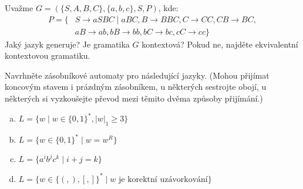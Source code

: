 \documentclass[a4paper,12pt]{amsart}
\begin{document}
\medskip\begin{problem}
    
    Uvažme $G=(\{S,A,B,C\},\{a,b,c\},S,P)$, kde:
    \begin{align*}
        P=\{&S\rightarrow aSBC\mid aBC, B\rightarrow BBC,  C\rightarrow CC, CB\rightarrow BC,\\ 
        &aB\rightarrow ab, bB\rightarrow bb, bC\rightarrow bc, cC\rightarrow cc\}
    \end{align*}
    Jaký jazyk generuje? Je gramatika $G$ kontextová? Pokud ne, najděte ekvivalentní kontextovou gramatiku.
    
\end{problem}


\medskip\begin{problem}

    Navrhněte zásobníkové automaty pro následující jazyky. (Mohou přijímat koncovým stavem i prázdným zásobníkem, u některých sestrojte obojí, u některých si vyzkoušejte převod mezi těmito dvěma způsoby přijímání.)

    \medskip

    \begin{enumerate}[(a)]\setlength\itemsep{9pt}
        \item $L=\{w\mid w\in\{0,1\}^*,|w|_1\geq 3\}$        
        \item $L=\{w\in \{0,1\}^*\mid w=w^R\}$        
        \item $L=\{a^ib^jc^k\mid i+j=k\}$        
        \item $L=\{w\in\{(,),[,]\}^*\mid w\text{ je korektní uzávorkování}\}$
    \end{enumerate}

\end{problem}
\end{document}
